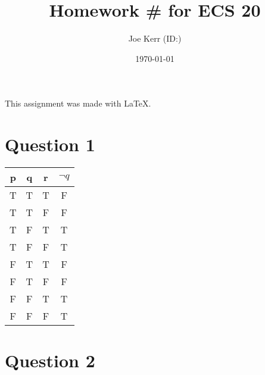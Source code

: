 \documentclass[a4paper,12pt]{article} %
\begin{document}

\title{Homework \# for ECS 20} %
\author{Joe Kerr (ID:)} %
\date{\today} %
\maketitle %

This assignment was made with \LaTeX. %

\tableofcontents %

\newpage %
 
\section{Question 1} %
\label{sec1} %

\begin{center} %
  \begin{tabular}{ |c|c|c|c| } %
    \hline %
    p & q & r & $ \neg q$ \\ \hline 
    T & T & T & F  \\ \hline %
    T & T & F & F  \\ \hline
    T & F & T & T  \\ \hline
    T & F & F & T  \\ \hline %
    F & T & T & F  \\ \hline
    F & T & F & F  \\ \hline
    F & F & T & T  \\ \hline
    F & F & F & T  \\ 
    \hline
  \end{tabular} %
\end{center}


\section{Question 2} 
\label{sec2}
\end{document}
